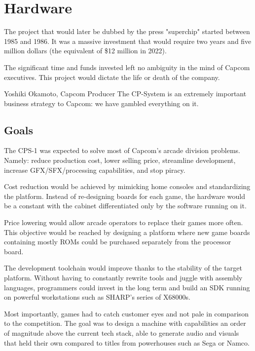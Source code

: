 \chapter{Hardware}
The project that would later be dubbed by the press "superchip"\cite{tgm198906} started between 1985 and 1986. It was a massive investment that would require two years and five million dollars\cite{becareful} (the equivalent of \$12 million in 2022).

The significant time and funds invested left no ambiguity in the mind of Capcom executives. This project would dictate the life or death of the company.

\begin{q}{Yoshiki Okamoto, Capcom Producer\cite{gamest38}}
The CP-System is an extremely important business strategy to Capcom: we have gambled everything on it.
\end{q}

\section{Goals}
The CPS-1 was expected to solve most of Capcom's arcade division problems. Namely: reduce production cost, lower selling price, streamline development, increase GFX/SFX/processing capabilities, and stop piracy. 

Cost reduction would be achieved by mimicking home consoles and standardizing the platform. Instead of re-designing boards for each game, the hardware would be a constant with the cabinet differentiated only by the software running on it.

Price lowering would allow arcade operators to replace their games more often. This objective would be reached by designing a platform where new game boards containing mostly ROMs could be purchased separately from the processor board.

The development toolchain would improve thanks to the stability of the target platform. Without having to constantly rewrite tools and juggle with assembly languages, programmers could invest in the long term and build an SDK running on powerful workstations such as SHARP's series of X68000s.

Most importantly, games had to catch customer eyes and not pale in comparison to the competition. The goal was to design a machine with capabilities an order of magnitude above the current tech stack, able to generate audio and visuals that held their own compared to titles from powerhouses such as Sega or Namco.

